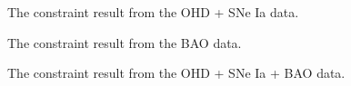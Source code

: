 \documentclass[twocolumn]{aastex631}
\begin{document}
   \begin{figure}[htbp]
      \centering
      \caption{The constraint result from the OHD + SNe Ia data.}
   \end{figure}

   \begin{figure}[htbp]
      \centering
      \caption{The constraint result from the BAO data.}
   \end{figure}

   \begin{figure}[htbp]
      \centering
      \caption{The constraint result from the OHD + SNe Ia + BAO data.}
      \label{fig:5}
   \end{figure}
\end{document}
